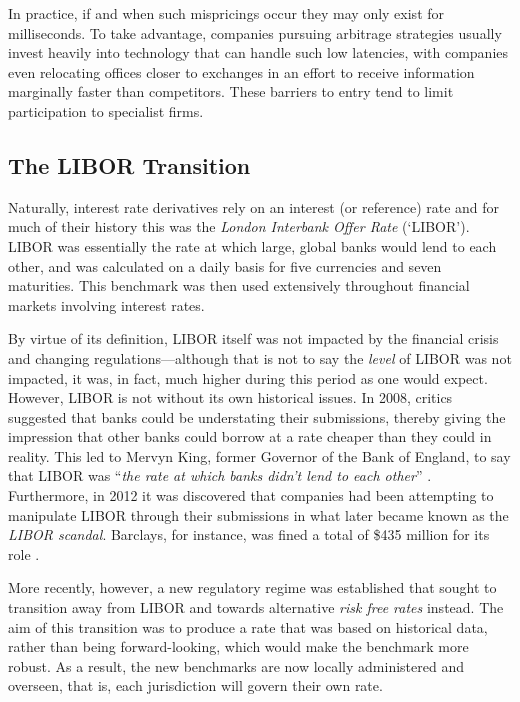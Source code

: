 In practice, if and when such mispricings occur they may only exist for milliseconds. To take advantage, companies pursuing arbitrage strategies usually invest heavily into technology that can handle such low latencies, with companies even relocating offices closer to exchanges in an effort to receive information marginally faster than competitors. These barriers to entry tend to limit participation to specialist firms. 

\subsection{The LIBOR Transition}
Naturally, interest rate derivatives rely on an interest (or reference) rate and for much of their history this was the \textit{London Interbank Offer Rate} (`LIBOR'). LIBOR was essentially the rate at which large, global banks would lend to each other, and was calculated on a daily basis for five currencies and seven maturities. This benchmark was then used extensively throughout financial markets involving interest rates.

By virtue of its definition, LIBOR itself was not impacted by the financial crisis and changing regulations––although that is not to say the \textit{level} of LIBOR was not impacted, it was, in fact, much higher during this period as one would expect. However, LIBOR is not without its own historical issues. In 2008, critics suggested that banks could be understating their submissions, thereby giving the impression that other banks could borrow at a rate cheaper than they could in reality. This led to Mervyn King, former Governor of the Bank of England, to say that LIBOR was ``\textit{the rate at which banks didn't lend to each other}'' \citep{TSC_Ch2_1}. Furthermore, in 2012 it was discovered that companies had been attempting to manipulate LIBOR through their submissions in what later became known as the \textit{LIBOR scandal}. Barclays, for instance, was fined a total of \$435 million for its role \citep{Libor_Ch2_1}. 

More recently, however, a new regulatory regime was established that sought to transition away from LIBOR and towards alternative \textit{risk free rates} instead. The aim of this transition was to produce a rate that was based on historical data, rather than being forward-looking, which would make the benchmark more robust. As a result, the new benchmarks are now locally administered and overseen, that is, each jurisdiction will govern their own rate. 


